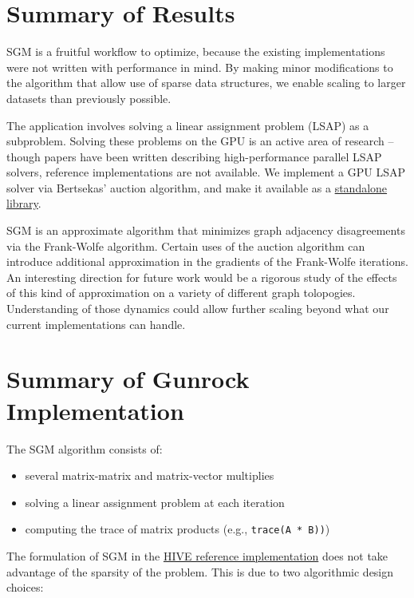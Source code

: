 \documentclass[10pt,oneside]{memoir}
\providecommand{\tightlist}{%
  \setlength{\itemsep}{0pt}\setlength{\parskip}{0pt}}
\begin{document}
\hypertarget{summary-of-results-7}{%
\section{Summary of Results}\label{summary-of-results-7}}

SGM is a fruitful workflow to optimize, because the existing
implementations were not written with performance in mind. By making
minor modifications to the algorithm that allow use of sparse data
structures, we enable scaling to larger datasets than previously
possible.

The application involves solving a linear assignment problem (LSAP) as a
subproblem. Solving these problems on the GPU is an active area of
research -- though papers have been written describing high-performance
parallel LSAP solvers, reference implementations are not available. We
implement a GPU LSAP solver via Bertsekas' auction algorithm, and make
it available as a \href{https://github.com/bkj/cbert}{standalone
library}.

SGM is an approximate algorithm that minimizes graph adjacency
disagreements via the Frank-Wolfe algorithm. Certain uses of the auction
algorithm can introduce additional approximation in the gradients of the
Frank-Wolfe iterations. An interesting direction for future work would
be a rigorous study of the effects of this kind of approximation on a
variety of different graph tolopogies. Understanding of those dynamics
could allow further scaling beyond what our current implementations can
handle.

\hypertarget{summary-of-gunrock-implementation-6}{%
\section{Summary of Gunrock
Implementation}\label{summary-of-gunrock-implementation-6}}

The SGM algorithm consists of:

\begin{itemize}
\tightlist
\item
  several matrix-matrix and matrix-vector multiplies
\item
  solving a linear assignment problem at each iteration
\item
  computing the trace of matrix products (e.g.,
  \texttt{trace(A\ *\ B))})
\end{itemize}

The formulation of SGM in the
\href{https://gitlab.hiveprogram.com/ggillary/seeded_graph_matching_brain_connectome/blob/master/sgm.py}{HIVE
reference implementation} does not take advantage of the sparsity of the
problem. This is due to two algorithmic design choices:
\end{document}

